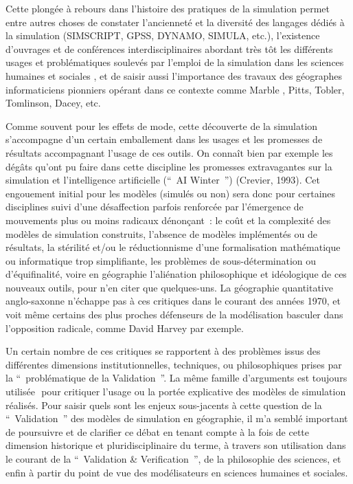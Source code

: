 Cette plongée à rebours dans l'histoire des pratiques de la simulation permet entre autres choses de constater l'ancienneté et la diversité des langages dédiés à la simulation (SIMSCRIPT, GPSS, DYNAMO, SIMULA, etc.), l'existence  d'ouvrages et de conférences interdisciplinaires abordant très tôt les différents usages et problématiques soulevés par l'emploi de la simulation dans les sciences humaines et sociales \autocites{Shubik1960b,Shubik1960a, Borko1962, Guetzkow1962, Beshers1965, Guetzkow1972, Shubik1972, Morgan2004, Dutton1971}⁠⁠, et de saisir aussi l'importance des travaux des géographes informaticiens pionniers opérant dans ce contexte comme Marble , Pitts, Tobler, Tomlinson, Dacey, etc. \autocites{Marble2010, Marble1972}

Comme souvent pour les effets de mode, cette découverte de la simulation  s'accompagne d'un certain emballement dans les usages et les promesses de résultats accompagnant l'usage de ces outils. On connaît bien par exemple les dégâts qu'ont pu faire dans cette discipline les promesses extravagantes sur la simulation et l'intelligence artificielle (\foreignquote{english}{ AI Winter }) (Crevier, 1993). Cet engouement initial pour les modèles (simulés ou  non) sera donc pour certaines disciplines suivi d'une désaffection parfois renforcée par l'émergence de mouvements plus ou moins radicaux dénonçant : le coût et la complexité des modèles de simulation construits, l'absence de modèles implémentés ou de résultats, la stérilité et/ou le réductionnisme d'une formalisation mathématique ou informatique trop simplifiante, les problèmes de sous-détermination ou d'équifinalité, voire en géographie l'aliénation philosophique et idéologique de ces nouveaux outils, pour n'en citer que quelques-uns. La géographie quantitative anglo-saxonne n'échappe pas à ces critiques dans le courant des années 1970, et voit même certains des plus proches défenseurs de la modélisation basculer dans l'opposition radicale, comme David Harvey par exemple.

Un certain nombre de ces critiques se rapportent à des problèmes issus des différentes dimensions institutionnelles, techniques, ou philosophiques prises par la \enquote{ problématique de la Validation }. La même famille d'arguments est toujours utilisée \autocites{Amblard2006, Waldherr2013}⁠ pour critiquer l'usage ou la portée explicative des modèles de simulation réalisés. Pour saisir quels sont les enjeux sous-jacents à cette question de la \enquote{ Validation } des modèles de simulation en géographie, il m'a semblé important de poursuivre et de clarifier ce débat en tenant compte à la fois de cette dimension historique et pluridisciplinaire du terme, à travers son utilisation dans le courant de la \enquote{ Validation \& Verification }, de la philosophie des sciences, et enfin à partir du point de vue des modélisateurs en sciences humaines et sociales. 

